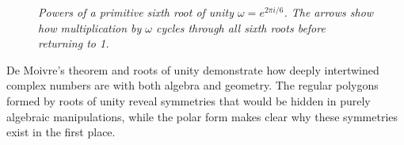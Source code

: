 \begin{figure}[H]
\centering
{}
\caption{\textit{Powers of a primitive sixth root of unity $\omega = e^{2\pi i/6}$. The arrows show how multiplication by $\omega$ cycles through all sixth roots before returning to 1.}}
\label{fig:primitive-roots}
\end{figure}

\noindent De Moivre's theorem and roots of unity demonstrate how deeply intertwined complex numbers are with both algebra and geometry. The regular polygons formed by roots of unity reveal symmetries that would be hidden in purely algebraic manipulations, while the polar form makes clear why these symmetries exist in the first place.


